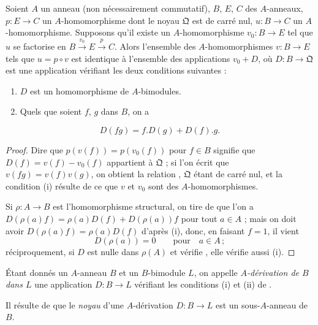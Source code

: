 \begin{proposition}[20.1.1]
\label{0.20.1.1-fr}
Soient $A$ un anneau (non nécessairement commutatif), $B$, $E$, $C$ des
$A$-anneaux, $p:E\to C$ un $A$-homomorphisme dont le noyau $\mathfrak{Q}$
est de carré nul, $u:B\to C$ un $A$-homomorphisme. Supposons qu'il existe
un $A$-homomorphisme $v_0:B\to E$ tel que $u$ se factorise en
$B\xrightarrow{v_0}E\xrightarrow{p}C$. Alors l'ensemble des
$A$-homomorphismes $v:B\to E$ tels que $u=p\circ v$ est identique à
l'ensemble des applications $v_0+D$, où $D:B\to\mathfrak{Q}$ est une
application vérifiant les deux conditions suivantes :
\begin{enumerate}
  \item[\rm(i)] $D$ est un homomorphisme de $A$-bimodules.
  \item[\rm(ii)] Quels que soient $f$, $g$ dans $B$, on a
\end{enumerate}
\begin{equation}
\tag{20.1.1.1}
\label{0.20.1.1.1-fr}
  D(fg)=f.D(g)+D(f).g.
\end{equation}
\end{proposition}

\begin{proof}
Dire que $p(v(f))=p(v_0(f))$ pour $f\in B$ signifie que
$D(f)=v(f)-v_0(f)$ appartient à $\mathfrak{Q}$ ; si l'on écrit que
$v(fg)=v(f)v(g)$, on obtient la relation ,
$\mathfrak{Q}$ étant de carré nul, et la condition (i) résulte de ce que $v$
et $v_0$ sont des $A$-homomorphismes.

Si $\rho:A\to B$ est l'homomorphisme structural, on tire de
 que l'on a
$D(\rho(a)f)=\rho(a)D(f)+D(\rho(a))f$ pour tout $a\in A$ ; mais on doit
avoir $D(\rho(a)f)=\rho(a)D(f)$ d'après (i), donc, en faisant $f=1$, il
vient
\[
  D(\rho(a))=0 \qquad\text{pour}\quad a\in A\,;
\]
réciproquement, si $D$ est nulle dans $\rho(A)$ et vérifie
, elle vérifie aussi (i).
\end{proof}

\begin{definition}[20.1.2]
\label{0.20.1.2-fr}
Étant donnés un $A$-anneau $B$ et un $B$-bimodule $L$, on appelle
\emph{$A$-dérivation de $B$ dans $L$} une application $D:B\to L$ vérifiant
les conditions (i) et (ii) de .
\end{definition}

Il résulte de  que le \emph{noyau} d'une $A$-dérivation
$D:B\to L$ est un sous-$A$-anneau de $B$.

